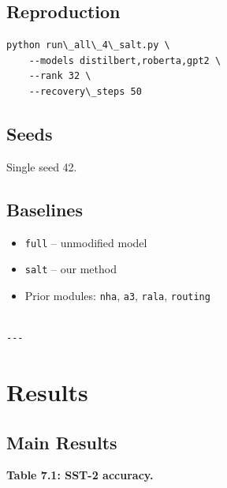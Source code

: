 \subsection{Reproduction}

\begin{lstlisting}
python run\_all\_4\_salt.py \
    --models distilbert,roberta,gpt2 \
    --rank 32 \
    --recovery\_steps 50
\end{lstlisting}

\subsection{Seeds}

Single seed 42.

\subsection{Baselines}

\begin{itemize}
\item \texttt{full} -- unmodified model
\item \texttt{salt} -- our method
\item Prior modules: \texttt{nha}, \texttt{a3}, \texttt{rala}, \texttt{routing}
\end{itemize}
\begin{lstlisting}

---
\end{lstlisting}


\section{Results}

\subsection{Main Results}

\textbf{Table 7.1: SST-2 accuracy.}

